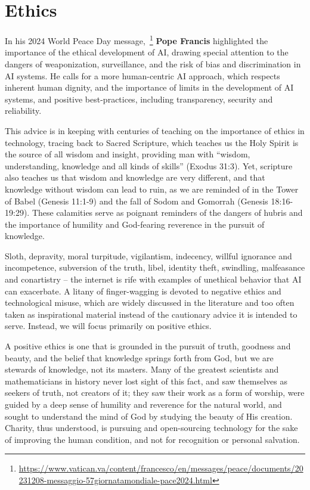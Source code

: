 \documentclass[sigplan,nonacm]{acmart}\settopmatter{printfolios=false,printccs=false,printacmref=false}
\begin{document}
  \section{Ethics}

  In his 2024 World Peace Day message,~\footnote{\url{https://www.vatican.va/content/francesco/en/messages/peace/documents/20231208-messaggio-57giornatamondiale-pace2024.html}} \textbf{Pope Francis} highlighted the importance of the ethical development of AI, drawing special attention to the dangers of weaponization, surveillance, and the risk of bias and discrimination in AI systems. He calls for a more human-centric AI approach, which respects inherent human dignity, and the importance of limits in the development of AI systems, and positive best-practices, including transparency, security and reliability.

  This advice is in keeping with centuries of teaching on the importance of ethics in technology, tracing back to Sacred Scripture, which teaches us the Holy Spirit is the source of all wisdom and insight, providing man with ``wisdom, understanding, knowledge and all kinds of skills'' (Exodus 31:3). Yet, scripture also teaches us that wisdom and knowledge are very different, and that knowledge without wisdom can lead to ruin, as we are reminded of in the Tower of Babel (Genesis 11:1-9) and the fall of Sodom and Gomorrah (Genesis 18:16-19:29). These calamities serve as poignant reminders of the dangers of hubris and the importance of humility and God-fearing reverence in the pursuit of knowledge.

  Sloth, depravity, moral turpitude, vigilantism, indecency, willful ignorance and incompetence, subversion of the truth, libel, identity theft, swindling, malfeasance and conartistry -- the internet is rife with examples of unethical behavior that AI can exacerbate. A litany of finger-wagging is devoted to negative ethics and technological misuse, which are widely discussed in the literature and too often taken as inspirational material instead of the cautionary advice it is intended to serve. Instead, we will focus primarily on positive ethics.

  A positive ethics is one that is grounded in the pursuit of truth, goodness and beauty, and the belief that knowledge springs forth from God, but we are stewards of knowledge, not its masters. Many of the greatest scientists and mathematicians in history never lost sight of this fact, and saw themselves as seekers of truth, not creators of it; they saw their work as a form of worship, were guided by a deep sense of humility and reverence for the natural world, and sought to understand the mind of God by studying the beauty of His creation. Charity, thus understood, is pursuing and open-sourcing technology for the sake of improving the human condition, and not for recognition or personal salvation.
\end{document}
